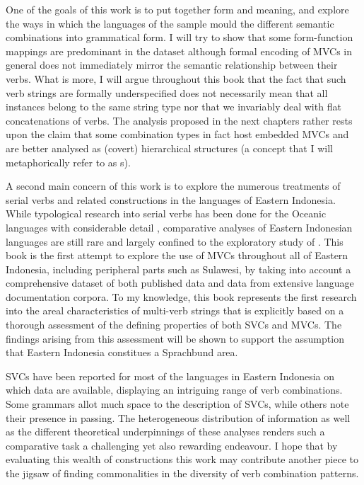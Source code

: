 One of the goals of this work is to put together form and meaning, and explore the ways in which the languages of the sample mould the different semantic combinations into grammatical form. I will try to show that some form-function mappings are predominant in the dataset although formal encoding of MVCs in general does not immediately mirror the semantic relationship between their verbs. What is more, I will argue throughout this book that the fact that such verb strings are formally underspecified does not necessarily mean that all instances belong to the same string type nor that we invariably deal with flat concatenations of verbs. The analysis proposed in the next chapters rather rests upon the claim that some combination types in fact host embedded MVCs and are better analysed as (covert) hierarchical structures (a concept that I will metaphorically refer to as s).

A second main concern of this work is to explore the numerous treatments of serial verbs and related constructions in the languages of Eastern Indonesia. While typological research into serial verbs has been done for the Oceanic languages with considerable detail \citep{crowley2002serial, bril2004complex, bril2007nexus}, comparative analyses of Eastern Indonesian languages are still rare and largely confined to the exploratory study of \citet{vanstaden2008serial}. This book is the first attempt to explore the use of MVCs throughout all of Eastern Indonesia, including peripheral parts such as Sulawesi, by taking into account a comprehensive dataset of both published data and data from extensive language documentation corpora. To my knowledge, this book represents the first research into the areal characteristics of multi-verb strings that is explicitly based on a thorough assessment of the defining properties of both SVCs and MVCs. The findings arising from this assessment will be shown to support the assumption that Eastern Indonesia constitues a Sprachbund area.

SVCs have been reported for most of the languages in Eastern Indonesia on which data are available, displaying an intriguing range of verb combinations. Some grammars allot much space to the description of SVCs, while others note their presence in passing. The heterogeneous distribution of information as well as the different theoretical underpinnings of these analyses renders such a comparative task a challenging yet also rewarding endeavour. I hope that by evaluating this wealth of constructions this work may contribute another piece to the jigsaw of finding commonalities in the diversity of verb combination patterns.


